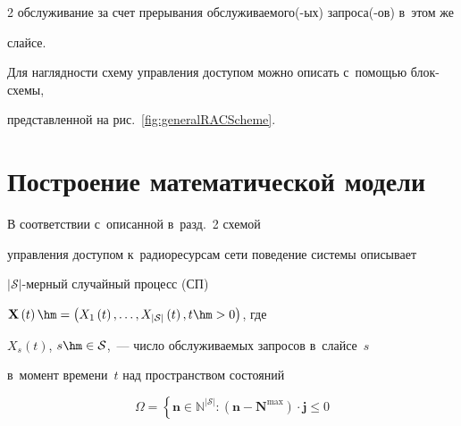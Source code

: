 \begin{multicols}{2}
обслуживание за счет прерывания об\-слу\-жи\-ва\-емо\-\mbox{го(-ых)} за\-про\-са(-ов) в~этом же 


слайсе.





Для наглядности схему управ\-ле\-ния до\-сту\-пом можно описать с~по\-мощью блок-схе\-мы, 


пред\-став\-лен\-ной на рис.~\ref{fig:generalRACScheme}.





\vspace*{-14pt}








\section{Построение математической модели}\label{sec:mathModel}





\vspace*{-4pt}





В соответствии с~описанной в~разд.~2 схемой 


управ\-ле\-ния доступом к~радиоресурсам сети поведение системы описывает 


$\lvert\mathcal{S}\rvert$-мер\-ный случайный процесс (СП) 


$\mathbf{X}\left(t\right) \hm= \left( X_1\left(t\right),\ldots, 


X_{\lvert\mathcal{S}\rvert}\left(t\right), t\hm>0 \right)$, где 


$X_s\left(t\right)$, $s\hm\in\mathcal{S}$,~--- чис\-ло об\-слу\-жи\-ва\-емых запросов в~слайсе~$s$ 


в~момент времени~$t$ над пространством со\-сто\-яний





\noindent


\begin{equation*}




\Omega =


\left\{


\mathbf{n} \in \mathbb{N}^{\lvert\mathcal{S}\rvert} :


\left( \mathbf{n} - \mathbf{N}^{\max} \right) \cdot \mathbf{j} \leq 0



\end{equation*}
\end{multicols}
